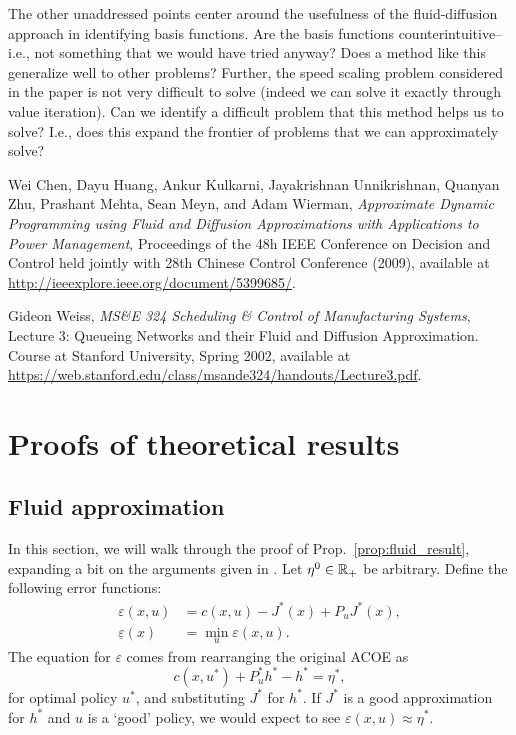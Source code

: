 \documentclass[11pt]{article}
\begin{document}
The other unaddressed points center around the usefulness of the fluid-diffusion approach in identifying basis functions. Are the basis functions counterintuitive--i.e., not something that we would have tried anyway? Does a method like this generalize well to other problems? Further, the speed scaling problem considered in the paper is not very difficult to solve (indeed we can solve it exactly through value iteration). Can we identify a difficult problem that this method helps us to solve? I.e., does this expand the frontier of problems that we can approximately solve?









\small \begin{thebibliography}{10}

	Wei Chen, Dayu Huang, Ankur Kulkarni, Jayakrishnan Unnikrishnan, Quanyan Zhu, Prashant Mehta, Sean Meyn, and Adam Wierman,
	\emph{Approximate Dynamic Programming using Fluid and Diffusion Approximations with Applications to Power Management},
	Proceedings of the 48h IEEE Conference on Decision and Control held jointly with 28th Chinese Control Conference (2009),
	available at \url{http://ieeexplore.ieee.org/document/5399685/}.

	Gideon Weiss,
	\emph{MS\&E 324 Scheduling \& Control of Manufacturing Systems},
	Lecture 3: Queueing Networks and their Fluid and Diffusion Approximation.
	Course at Stanford University, Spring 2002,
	available at \url{https://web.stanford.edu/class/msande324/handouts/Lecture3.pdf}.

\end{thebibliography}



\appendix

\section{Proofs of theoretical results}

\subsection{Fluid approximation}\label{appendix:fluid}

In this section, we will walk through the proof of Prop.~\ref{prop:fluid_result}, expanding a bit on the arguments given in \cite{paper}. Let $\eta^0 \in \mathbb{R}_+$ be arbitrary. Define the following error functions:
$$\begin{aligned}
\varepsilon(x,u) &= c(x,u) - J^*(x) + P_u J^*(x), \\
\underline \varepsilon(x) &= \min_u \varepsilon(x,u).
\end{aligned}$$
The equation for $\varepsilon$ comes from rearranging the original ACOE as
$$c(x,u^*) + P_u^* h^* - h^* = \eta^*,$$
for optimal policy $u^*$, and substituting $J^*$ for $h^*$. If $J^*$ is a good approximation for $h^*$ and $u$ is a `good' policy, we would expect to see $\varepsilon(x,u) \approx \eta^*$.
\end{document}
